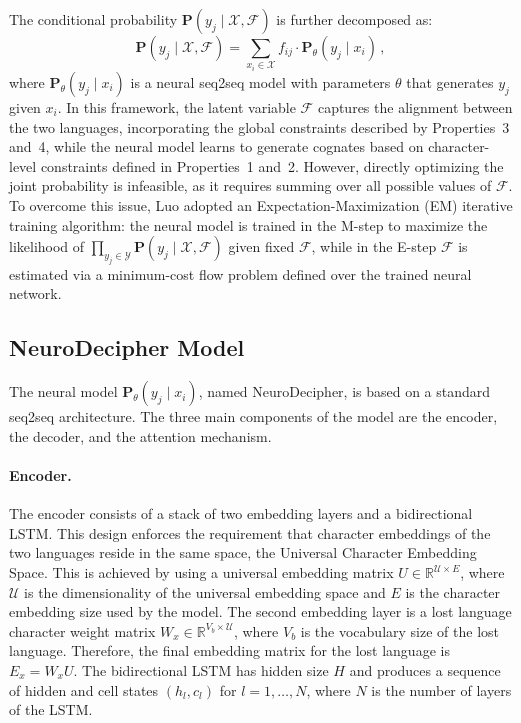 The conditional probability $\mathbf{P}(y_j \mid \mathcal{X}, \mathcal{F})$ is further decomposed as:
\[
\mathbf{P}(y_j \mid \mathcal{X}, \mathcal{F})
= \sum_{x_i\in \mathcal{X}} f_{ij}\cdot \mathbf{P}_{\theta}(y_j \mid x_i) \, ,
\]
where $\mathbf{P}_{\theta}(y_j \mid x_i)$ is a neural seq2seq model with parameters $\theta$ that generates $y_j$ given $x_i$.
In this framework, the latent variable $\mathcal{F}$ captures the alignment between the two languages, incorporating the global constraints described by Properties~3 and~4, while the neural model learns to generate cognates based on character-level constraints defined in Properties~1 and~2.
However, directly optimizing the joint probability is infeasible, as it requires summing over all possible values of $\mathcal{F}$.
To overcome this issue, Luo adopted an Expectation-Maximization (EM) iterative training algorithm: the neural model is trained in the M-step to maximize the likelihood of $\prod_{y_j\in \mathcal{Y}} \mathbf{P}(y_j \mid \mathcal{X}, \mathcal{F})$ given fixed $\mathcal{F}$, while in the E-step $\mathcal{F}$ is estimated via a minimum-cost flow problem defined over the trained neural network.

\subsection{NeuroDecipher Model}
The neural model $\mathbf{P}_{\theta}(y_j \mid x_i)$, named NeuroDecipher, is based on a standard seq2seq architecture.
The three main components of the model are the encoder, the decoder, and the attention mechanism.

\paragraph{Encoder.}
The encoder consists of a stack of two embedding layers and a bidirectional LSTM.
This design enforces the requirement that character embeddings of the two languages reside in the same space, the Universal Character Embedding Space.
This is achieved by using a universal embedding matrix $U\in\mathbb{R}^{\mathcal{U}\times E}$, where $\mathcal{U}$ is the dimensionality of the universal embedding space and $E$ is the character embedding size used by the model.
The second embedding layer is a lost language character weight matrix $W_x\in\mathbb{R}^{V_b\times \mathcal{U}}$, where $V_b$ is the vocabulary size of the lost language.
Therefore, the final embedding matrix for the lost language is $E_x = W_x U$.
The bidirectional LSTM has hidden size $H$ and produces a sequence of hidden and cell states $(h_l,c_l)$ for $l=1,\ldots,N$, where $N$ is the number of layers of the LSTM.

